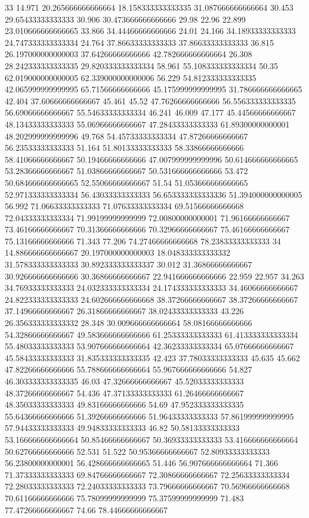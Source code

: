 33 14.971 20.265666666666664 18.158333333333335 31.087666666666664 30.453 29.65433333333333 30.906 30.473666666666666 29.98 22.96 22.899 23.010666666666665 33.866 34.44466666666666 24.01 24.166 34.18933333333333 24.747333333333334 24.764 37.86633333333333 37.86633333333333 36.815 26.197000000000003 37.64266666666666 42.782666666666664 26.308 28.242333333333335 29.820333333333334 58.961 55.108333333333334 50.35 62.019000000000005 62.339000000000006 56.229 54.812333333333335 42.065999999999995 65.71566666666666 45.175999999999995 31.786666666666665 42.404 37.60666666666667 45.461 45.52 47.76266666666666 56.556333333333335 56.69066666666667 55.54633333333334 46.241 46.009 47.177 45.44566666666667 48.13433333333333 55.06966666666667 47.28433333333333 61.89300000000001 48.202999999999996 49.768 54.45733333333334 47.87266666666667 56.23533333333333 51.164 51.80133333333333 58.33866666666666 58.41066666666667 50.19466666666666 47.007999999999996 50.614666666666665 53.28366666666667 51.03866666666667 50.531666666666666 53.472 50.684666666666665 52.55066666666667 51.54 51.053666666666665 52.971333333333334 56.43033333333333 56.653333333333336 51.394000000000005 56.992 71.06633333333333 71.07633333333334 69.51566666666668 72.04333333333334 71.99199999999999 72.00800000000001 71.96166666666667 73.46166666666667 70.31366666666666 70.32966666666667 75.46166666666667 75.13166666666666 71.343 77.206 74.27466666666668 78.23833333333333
34 14.886666666666667 20.197000000000003 18.048333333333332 31.578333333333333 30.892333333333337 30.012 31.36866666666667 30.926666666666666 30.36866666666667 22.941666666666666 22.959 22.957 34.263 34.76933333333333 24.032333333333334 24.174333333333333 34.46066666666667 24.822333333333333 24.602666666666668 38.37266666666667 38.37266666666667 37.14966666666667 26.31866666666667 38.02433333333333 43.226 26.356333333333332 28.348 30.009666666666664 58.08166666666666 54.32866666666667 49.583666666666666 61.25333333333333 61.413333333333334 55.48033333333333 53.907666666666664 42.36233333333334 65.07666666666667 45.58433333333333 31.835333333333335 42.423 37.78033333333333 45.635 45.662 47.82266666666666 55.788666666666664 55.967666666666666 54.827 46.303333333333335 46.03 47.32666666666667 45.52033333333333 48.37266666666667 54.436 47.37133333333333 61.26466666666667 48.35033333333333 49.83166666666666 54.69 47.952333333333335 55.64366666666666 51.39266666666666 51.96433333333333 57.861999999999995 57.94433333333333 49.94833333333333 46.82 50.58133333333333 53.166666666666664 50.85466666666667 50.36933333333333 53.416666666666664 50.62766666666666 52.531 51.522 50.95366666666667 52.80933333333333 56.23800000000001 56.428666666666665 51.446 56.907666666666664 71.366 71.37333333333333 69.84766666666667 72.30866666666667 72.25633333333334 72.28033333333333 72.24033333333333 73.79666666666667 70.56966666666668 70.61166666666666 75.78099999999999 75.37599999999999 71.483 77.47266666666667 74.66 78.44666666666667
